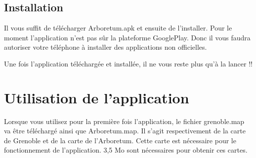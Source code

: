 \documentclass[a4paper,11pt]{article}
\begin{document}
   \subsection{Installation}
   Il vous suffit de télécharger Arboretum.apk et ensuite de l'installer. Pour le moment l'application n'est pas sûr la plateforme GooglePlay. Donc il 
   vous faudra autoriser votre téléphone à installer des applications non officielles.
   
   Une fois l'application téléchargée et installée, il ne vous reste plus qu'à la lancer !!
   
   \section{Utilisation de l'application}
       Lorsque vous utilisez pour la première fois l'application, le fichier grenoble.map va être téléchargé ainsi que Arboretum.map. Il s'agit respectivement de la
       carte de Grenoble et de la carte de l'Arboretum.
    Cette carte est nécessaire pour le fonctionnement de l'application. 3,5 Mo sont nécessaires pour obtenir ces cartes.
\end{document}
